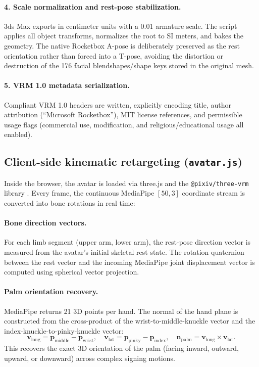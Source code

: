 \paragraph{4. Scale normalization and rest-pose stabilization.} 3ds Max exports in centimeter units with a 0.01 armature scale. The script applies all object transforms, normalizes the root to SI meters, and bakes the geometry. The native Rocketbox A-pose is deliberately preserved as the rest orientation rather than forced into a T-pose, avoiding the distortion or destruction of the 176 facial blendshapes/shape keys stored in the original mesh.

\paragraph{5. VRM 1.0 metadata serialization.} Compliant VRM 1.0 headers are written, explicitly encoding title, author attribution (``Microsoft Rocketbox''), MIT license references, and permissible usage flags (commercial use, modification, and religious/educational usage all enabled).

\subsection{Client-side kinematic retargeting (\texttt{avatar.js})}
Inside the browser, the avatar is loaded via three.js \cite{threejs} and the \texttt{@pixiv/three-vrm} library \cite{threevrm}. Every frame, the continuous MediaPipe $[50, 3]$ coordinate stream is converted into bone rotations in real time:

\paragraph{Bone direction vectors.} For each limb segment (upper arm, lower arm), the rest-pose direction vector is measured from the avatar's initial skeletal rest state. The rotation quaternion between the rest vector and the incoming MediaPipe joint displacement vector is computed using spherical vector projection.

\paragraph{Palm orientation recovery.} MediaPipe returns 21 3D points per hand. The normal of the hand plane is constructed from the cross-product of the wrist-to-middle-knuckle vector and the index-knuckle-to-pinky-knuckle vector:
\begin{equation}
  \mathbf{v}_{\text{long}} = \mathbf{p}_{\text{middle}} - \mathbf{p}_{\text{wrist}}, \quad
  \mathbf{v}_{\text{lat}} = \mathbf{p}_{\text{pinky}} - \mathbf{p}_{\text{index}}, \quad
  \mathbf{n}_{\text{palm}} = \mathbf{v}_{\text{long}} \times \mathbf{v}_{\text{lat}}.
\end{equation}
This recovers the exact 3D orientation of the palm (facing inward, outward, upward, or downward) across complex signing motions.

